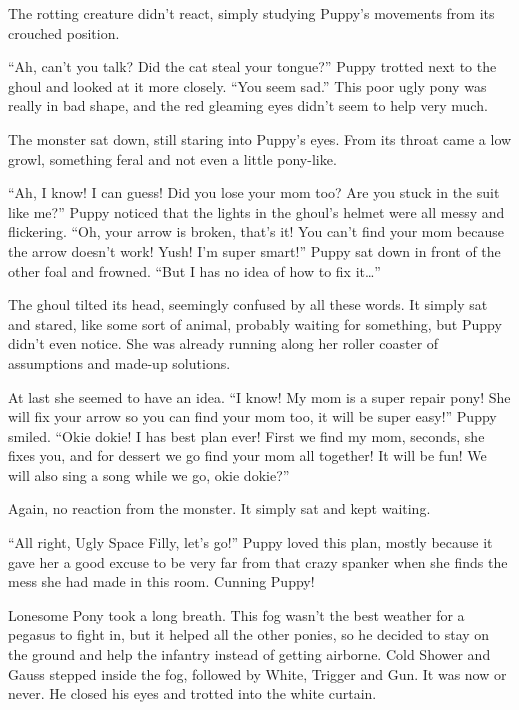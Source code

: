 The rotting creature didn't react, simply studying Puppy's movements from its crouched position.

``Ah, can't you talk? Did the cat steal your tongue?'' Puppy trotted next to the ghoul and looked at it more closely. ``You seem sad.'' This poor ugly pony was really in bad shape, and the red gleaming eyes didn't seem to help very much.

The monster sat down, still staring into Puppy's eyes. From its throat came a low growl, something feral and not even a little pony-like.

``Ah, I know! I can guess! Did you lose your mom too? Are you stuck in the suit like me?'' Puppy noticed that the lights in the ghoul's helmet were all messy and flickering. ``Oh, your arrow is broken, that's it! You can't find your mom because the arrow doesn't work! Yush! I'm super smart!'' Puppy sat down in front of the other foal and frowned. ``But I has no idea of how to fix it\dots''

The ghoul tilted its head, seemingly confused by all these words. It simply sat and stared, like some sort of animal, probably waiting for something, but Puppy didn't even notice. She was already running along her roller coaster of assumptions and made-up solutions.

At last she seemed to have an idea. ``I know! My mom is a super repair pony! She will fix your arrow so you can find your mom too, it will be super easy!'' Puppy smiled. ``Okie dokie! I has best plan ever! First we find my mom, seconds, she fixes you, and for dessert we go find your mom all together! It will be fun! We will also sing a song while we go, okie dokie?''

Again, no reaction from the monster. It simply sat and kept waiting.

``All right, Ugly Space Filly, let's go!'' Puppy loved this plan, mostly because it gave her a good excuse to be very far from that crazy spanker when she finds the mess she had made in this room. Cunning Puppy!



\horizonline


Lonesome Pony took a long breath. This fog wasn't the best weather for a pegasus to fight in, but it helped all the other ponies, so he decided to stay on the ground and help the infantry instead of getting airborne. Cold Shower and Gauss stepped inside the fog, followed by White, Trigger and Gun. It was now or never. He closed his eyes and trotted into the white curtain.

